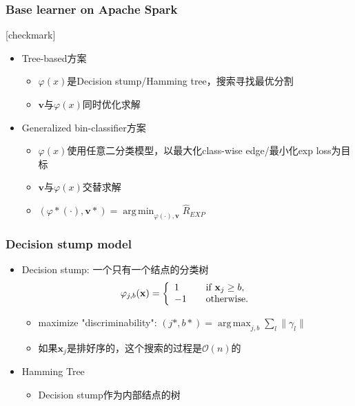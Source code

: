 \documentclass{beamer}
\DeclareMathOperator*{\argmin}{arg\,min}
\DeclareMathOperator*{\argmax}{arg\,max}
\begin{document}
\begin{frame}
\frametitle{Base learner on Apache Spark}
{
  [checkmark]
  \begin{itemize}
    \item Tree-based方案
      \begin{itemize}
        \item $\varphi(x)$是Decision stump/Hamming tree，搜索寻找最优分割
        \item $\mathbf{v}$与$\varphi(x)$同时优化求解
      \end{itemize}
    \item Generalized bin-classifier方案
      \begin{itemize}
        \item $\varphi(x)$使用任意二分类模型，以最大化class-wise edge/最小化exp loss为目标
        \item $\mathbf{v}$与$\varphi(x)$交替求解
        \item $(\varphi*(\cdot),\mathbf{v}*) = \argmin_{\varphi(\cdot), \mathbf{v}} \hat{R}_{EXP}$
      \end{itemize}
  \end{itemize}
}
\end{frame}

\begin{frame}
\frametitle{Decision stump model}
\begin{itemize}
\item Decision stump: 一个只有一个结点的分类树
$$ \varphi_{j,b}(\mathbf{x}) = \left\{
  \begin{array}{l l}
    1 & \quad \text{if } \mathbf{x}_j \geq b, \\
    -1 & \quad \text{otherwise.}
  \end{array} \right.$$
  \begin{itemize}
    \item maximize "discriminability": $(j*,b*) = \argmax_{j,b} \sum_{l}\| \gamma_l \|$
    \item 如果$\mathbf{x}_j$是排好序的，这个搜索的过程是$\mathcal{O}(n)$的
  \end{itemize}
\item Hamming Tree
  \begin{itemize}
    \item Decision stump作为内部结点的树
  \end{itemize}
\end{itemize}
\end{frame}
\end{document}
